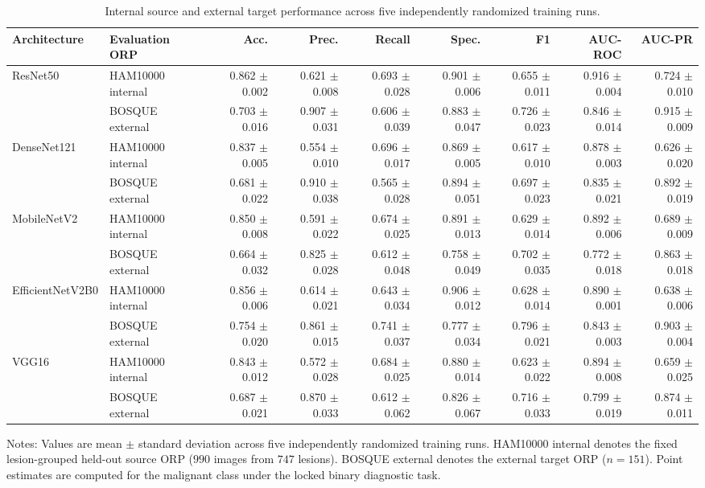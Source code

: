 \begin{table}[h!]
\centering
\scriptsize
\caption{Internal source and external target performance across five independently randomized training runs.}
\label{tab:internal-external-performance}
\setlength{\tabcolsep}{3.5pt}
\renewcommand{\arraystretch}{1.08}
\begin{tabular}{llrrrrrrr}
\toprule
\textbf{Architecture} & \textbf{Evaluation ORP} & \textbf{Acc.} & \textbf{Prec.} & \textbf{Recall} & \textbf{Spec.} & \textbf{F1} & \textbf{AUC-ROC} & \textbf{AUC-PR} \\
\midrule
ResNet50 & HAM10000 internal & 0.862 $\pm$ 0.002 & 0.621 $\pm$ 0.008 & 0.693 $\pm$ 0.028 & 0.901 $\pm$ 0.006 & 0.655 $\pm$ 0.011 & 0.916 $\pm$ 0.004 & 0.724 $\pm$ 0.010 \\
 & BOSQUE external & 0.703 $\pm$ 0.016 & 0.907 $\pm$ 0.031 & 0.606 $\pm$ 0.039 & 0.883 $\pm$ 0.047 & 0.726 $\pm$ 0.023 & 0.846 $\pm$ 0.014 & 0.915 $\pm$ 0.009 \\
\addlinespace
DenseNet121 & HAM10000 internal & 0.837 $\pm$ 0.005 & 0.554 $\pm$ 0.010 & 0.696 $\pm$ 0.017 & 0.869 $\pm$ 0.005 & 0.617 $\pm$ 0.010 & 0.878 $\pm$ 0.003 & 0.626 $\pm$ 0.020 \\
 & BOSQUE external & 0.681 $\pm$ 0.022 & 0.910 $\pm$ 0.038 & 0.565 $\pm$ 0.028 & 0.894 $\pm$ 0.051 & 0.697 $\pm$ 0.023 & 0.835 $\pm$ 0.021 & 0.892 $\pm$ 0.019 \\
\addlinespace
MobileNetV2 & HAM10000 internal & 0.850 $\pm$ 0.008 & 0.591 $\pm$ 0.022 & 0.674 $\pm$ 0.025 & 0.891 $\pm$ 0.013 & 0.629 $\pm$ 0.014 & 0.892 $\pm$ 0.006 & 0.689 $\pm$ 0.009 \\
 & BOSQUE external & 0.664 $\pm$ 0.032 & 0.825 $\pm$ 0.028 & 0.612 $\pm$ 0.048 & 0.758 $\pm$ 0.049 & 0.702 $\pm$ 0.035 & 0.772 $\pm$ 0.018 & 0.863 $\pm$ 0.018 \\
\addlinespace
EfficientNetV2B0 & HAM10000 internal & 0.856 $\pm$ 0.006 & 0.614 $\pm$ 0.021 & 0.643 $\pm$ 0.034 & 0.906 $\pm$ 0.012 & 0.628 $\pm$ 0.014 & 0.890 $\pm$ 0.001 & 0.638 $\pm$ 0.006 \\
 & BOSQUE external & 0.754 $\pm$ 0.020 & 0.861 $\pm$ 0.015 & 0.741 $\pm$ 0.037 & 0.777 $\pm$ 0.034 & 0.796 $\pm$ 0.021 & 0.843 $\pm$ 0.003 & 0.903 $\pm$ 0.004 \\
\addlinespace
VGG16 & HAM10000 internal & 0.843 $\pm$ 0.012 & 0.572 $\pm$ 0.028 & 0.684 $\pm$ 0.025 & 0.880 $\pm$ 0.014 & 0.623 $\pm$ 0.022 & 0.894 $\pm$ 0.008 & 0.659 $\pm$ 0.025 \\
 & BOSQUE external & 0.687 $\pm$ 0.021 & 0.870 $\pm$ 0.033 & 0.612 $\pm$ 0.062 & 0.826 $\pm$ 0.067 & 0.716 $\pm$ 0.033 & 0.799 $\pm$ 0.019 & 0.874 $\pm$ 0.011 \\
\bottomrule
\end{tabular}
\begin{flushleft}
\footnotesize Notes: Values are mean $\pm$ standard deviation across five independently randomized training runs. HAM10000 internal denotes the fixed lesion-grouped held-out source ORP ($990$ images from $747$ lesions). BOSQUE external denotes the external target ORP ($n=151$). Point estimates are computed for the malignant class under the locked binary diagnostic task.
\end{flushleft}
\end{table}
